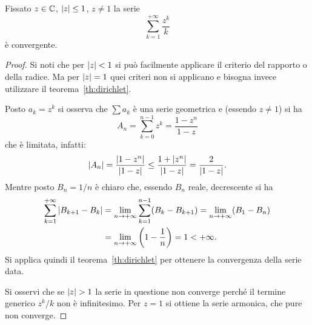 \begin{exercise}
Fissato $z\in {\mathbb C}$, ${\left|z\right|} \le 1$, $z\neq 1$ la serie
\[
  \sum_{k=1}^{+\infty} \frac{z^k}{k}
\]
è convergente.
\end{exercise}
\begin{proof}
Si noti che per ${\left|z\right|}<1$ si può facilmente applicare
il criterio del rapporto o della radice.
Ma per ${\left|z\right|}=1$ quei criteri non si applicano e
bisogna invece utilizzare il teorema~\ref{th:dirichlet}.

Posto $a_k=z^k$ si osserva che $\sum a_k$ è una
serie geometrica e (essendo $z\neq 1$) si ha
\[
  A_n = \sum_{k=0}^{n-1} z^k = \frac{1-z^n}{1-z}
\]
che è limitata, infatti:
\[
  {\left|A_n\right|} = \frac{{\left|1-z^n\right|}}{{\left|1-z\right|}} \le \frac{1+{\left|z^n\right|}}{{\left|1-z\right|}}
  = \frac{2}{{\left|1-z\right|}}.
\]
Mentre posto $B_n = 1/n$ è chiaro che, essendo $B_n$ reale,
decrescente si ha
\begin{align*}
\sum_{k=1}^{+\infty} {\left|B_{k+1}-B_{k}\right|}
&= \lim_{n\to +\infty}\sum_{k=1}^{n-1} (B_k-B_{k+1})
= \lim_{n\to +\infty}(B_1 - B_n)\\
&= \lim_{n\to +\infty}{\left( 1 - \frac{1}{n} \right)} = 1
< +\infty.
\end{align*}
Si applica quindi il teorema~\ref{th:dirichlet}
per ottenere la convergenza
della serie data.

Si osservi che se ${\left|z\right|}>1$ la serie in questione non
converge perché il termine generico $z^k/k$ non è infinitesimo.
Per $z=1$ si ottiene la serie armonica, che pure non converge.
\end{proof}


